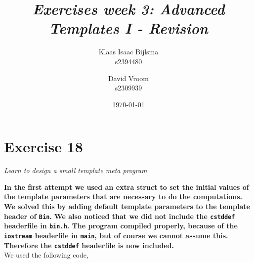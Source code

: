 \documentclass[12pt]{article}
\title{\itshape Exercises week 3: Advanced Templates I - Revision}
\author{
	Klaas Isaac Bijlsma \\ s2394480
	\and
	David Vroom \\ s2309939
}
\date{\today}
\newcommand{\desc}[1]{\textit{#1} \vspace{1em}}
\begin{document}
\maketitle

\section*{Exercise 18}
\desc{Learn to design a small template meta program}

\textbf{In the first attempt we used an extra struct to set the initial values of the template parameters that are necessary to do the computations. We solved this by adding default template parameters to the template header of \texttt{Bin}. We also noticed that we did not include the \texttt{cstddef} headerfile in \texttt{bin.h}. The program compiled properly, because of the \texttt{iostream} headerfile in \texttt{main}, but of course we cannot assume this. Therefore the \texttt{cstddef} headerfile is now included.}\\

We used the following code,




\clearpage
\end{document}
